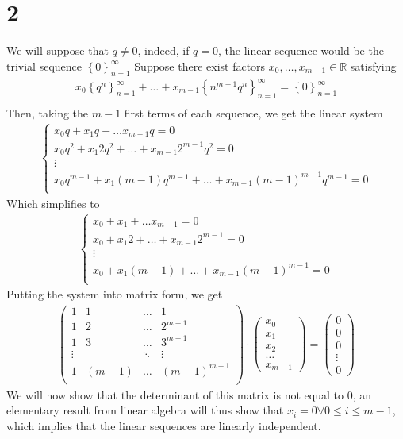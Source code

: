 \documentclass[11pt, a4paper]{article}
\begin{document}
\section*{2}
We will suppose that $q\neq 0$, indeed, if $q=0$, the linear sequence would be the trivial sequence $ \left\{ 0 \right\}_{n=1}^{ \infty }$
Suppose there exist factors $x_0,\ldots,x_{m-1} \in \mathbb{R}$ satisfying
\begin{align*}
x_0 \left\{ q^{n} \right\}_{n=1}^{ \infty }  + \ldots + x_{m-1} \left\{ n^{m-1} q^{n} \right\}_{n=1}^{ \infty } = \left\{ 0 \right\}_{n=1}^{ \infty } \\
\end{align*}
Then, taking the $m-1$ first terms of each sequence, we get the linear system
\begin{align*}
\begin{cases}
x_0 q + x_1 q + \ldots x_{m-1} q = 0\\
x_0 q^{2} + x_1 2 q^{2} + \ldots +x_{m-1} 2^{m-1} q^{2} = 0\\
\vdots\\
x_0 q^{m-1} + x_1 ( m-1) q^{m-1} + \ldots +x_{m-1} ( m-1) ^{m-1} q^{m-1} = 0\\
\end{cases}
\end{align*}
Which simplifies to
\begin{align*}
\begin{cases}
x_0  + x_1  + \ldots x_{m-1}  = 0\\
x_0  + x_1 2  + \ldots+ x_{m-1} 2^{m-1}  = 0\\
\vdots\\
x_0  + x_1 ( m-1) + \ldots +x_{m-1} ( m-1) ^{m-1}  = 0\\
\end{cases}
\end{align*}
Putting the system into matrix form, we get
\begin{align*}
\begin{pmatrix}
	1 & 1 & \ldots & 1 \\
	1 &2 & \ldots & 2^{m-1}\\
	1 &3 & \ldots & 3^{m-1}\\
	\vdots & & \ddots & \vdots \\
	1 & ( m-1)  & \ldots & ( m-1) ^{m-1}\\
\end{pmatrix}
\cdot 
\begin{pmatrix}
x_0 \\ x_1 \\ x_2 \\ \ldots \\ x_{m-1} 
\end{pmatrix}
= 
\begin{pmatrix}
0 \\ 0 \\ 0 \\ \vdots \\ 0
\end{pmatrix}
\end{align*}
We will now show that the determinant of this matrix is not equal to 0, an elementary result from linear algebra will thus show that $x_{i} = 0 \forall 0\leq i \leq m-1$, which implies that the linear sequences are linearly independent.












\end{document}
